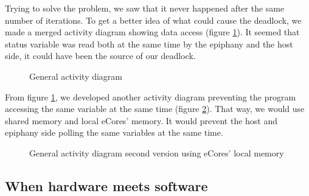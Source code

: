 Trying to solve the problem, we saw that it never happened after the same number of iterations. To get a better idea of what could cause the deadlock, we made a merged activity diagram showing data access (figure \ref{fig flow general}). It seemed that status variable was read both at the same time by the \gls{epiphany} and the host side, it could have been the source of our deadlock.

\begin{figure}[h!]
\centering
\noindent{}
\caption{General activity diagram}
\label{fig flow general}
\end{figure}

From figure \ref{fig flow general}, we developed another activity diagram preventing the program accessing the same variable at the same time (figure \ref{fig flow general V2}). That way, we would use shared memory and local \glspl{eCore}' memory. It would prevent the host and \gls{epiphany} side polling the same variables at the same time.

\begin{figure}[h!]
\centering
\noindent{}
\caption{General activity diagram second version using \glspl{eCore}' local memory}
\label{fig flow general V2}
\end{figure}

\subsection{When hardware meets software}

